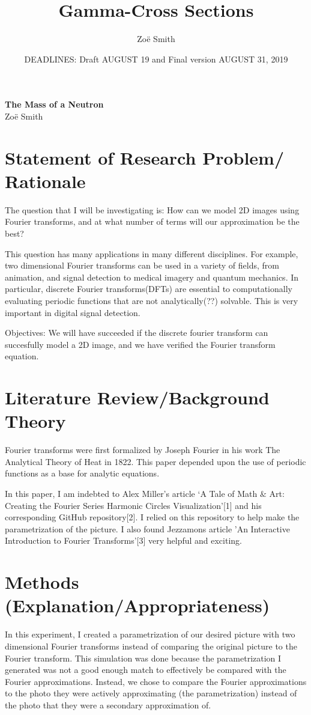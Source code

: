 \documentclass[psamsfonts]{amsart}
\title{Gamma-Cross Sections}
\author{Zo\"e Smith}
\date{DEADLINES: Draft AUGUST 19 and Final version AUGUST 31, 2019}
\theoremstyle{definition}
\theoremstyle{remark}
\numberwithin{equation}{section}
\begin{document}
\begin{center}
	{\bfseries The Mass of a Neutron}\\
	Zo\"e Smith
\end{center}

 \section{Statement of Research Problem/ Rationale}
 The question that I will be investigating is: How can we model 2D images using Fourier transforms, and at what number of terms will our approximation be the best?
 
 This question has many applications in many different disciplines. For example, two dimensional Fourier transforms can be used in a variety of fields, from animation, and signal detection to medical imagery and quantum mechanics. 	
 In particular, discrete Fourier transforms(DFTs) are essential to computationally evaluating periodic functions that are not analytically(??) solvable. This is very important in digital signal detection.

Objectives: We will have succeeded if the discrete fourier transform can succesfully model a 2D image, and we have verified the Fourier transform equation. 


 \section{Literature Review/Background Theory}
Fourier transforms were first formalized by Joseph Fourier in his work The Analytical Theory of Heat in 1822. This paper depended upon the use of periodic functions as a base for analytic equations. 

In this paper, I am indebted to Alex Miller's article `A Tale of Math $\&$ Art: Creating the Fourier Series Harmonic Circles Visualization'[1] and his corresponding GitHub repository[2]. I relied on this repository to help make the parametrization of the picture. I also found Jezzamons article 'An Interactive Introduction to Fourier Transforms'[3] very helpful and exciting. 

 
 
 \section{Methods (Explanation/Appropriateness)}
In this experiment, I created a parametrization of our desired picture with two dimensional Fourier transforms instead of comparing the original picture to the Fourier transform. This simulation was done because the parametrization I generated was not a good enough match to effectively be compared with the Fourier approximations. Instead, we chose to compare the Fourier approximations to the photo they were actively approximating (the parametrization) instead of the photo that they were a secondary approximation of. 
\end{document}
